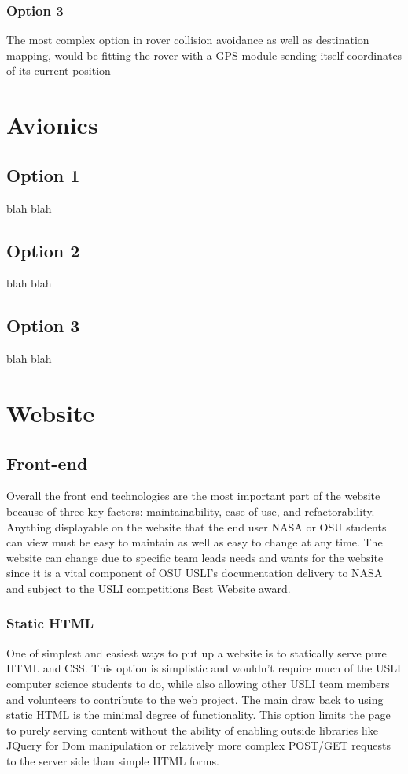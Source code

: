 \documentclass[onecolumn, draftclsnofoot,10pt, compsoc]{IEEEtran}
\begin{document}
\subsubsection{Option 3}
The most complex option in rover collision avoidance as well as destination mapping, would be fitting the rover with a GPS module sending itself coordinates of its current position

\section{Avionics}
\subsection{Option 1}
blah blah
\subsection{Option 2}
blah blah
\subsection{Option 3}
blah blah

\section{Website}
\subsection{Front-end}
Overall the front end technologies are the most important part of the website because of three key factors: maintainability, ease of use, and refactorability. Anything displayable on the website that the end user NASA or OSU students can view must be easy to maintain  as well as easy to change at any time. The website can change due to specific team leads needs and wants for the website since it is a vital component of OSU USLI's documentation delivery to NASA and subject to the USLI competitions Best Website award. 
\subsubsection{Static HTML}
One of simplest and easiest ways to put up a website is to statically serve pure HTML and CSS. This option is simplistic and wouldn't require much of the USLI computer science students to do, while also allowing other USLI team members and volunteers to contribute to the web project. The main draw back to using static HTML is the minimal degree of functionality. This option limits the page to purely serving content without the ability of enabling outside libraries like JQuery for Dom manipulation or relatively more complex POST/GET requests to the server side than simple HTML forms. 
\end{document}
